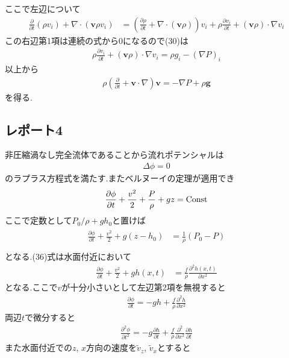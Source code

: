 \documentclass[uplatex,a4j,11pt,dvipdfmx]{jsarticle}
\begin{document}
ここで左辺について
\begin{align}
  \frac{\partial}{\partial t}(\rho v_i)+\nabla\cdot({\bm v}\rho v_i)&=
  \left(\frac{\partial \rho}{\partial t}+\nabla\cdot({\bm v}\rho)\right)v_i+\rho\frac{\partial v_i}{\partial t}+({\bm v}\rho)\cdot\nabla v_i
\end{align}
この右辺第1項は連続の式から0になるので(30)は
\begin{align}
  \rho\frac{\partial v_i}{\partial t}+({\bm v}\rho)\cdot\nabla v_i=\rho g_i-(\nabla P)_i
\end{align}
以上から
\begin{align}
  \rho\left(\frac{\partial}{\partial t}+{\bm v}\cdot\nabla\right){\bm v}=-\nabla P+\rho{\bm g}
\end{align}
を得る.
\subsection*{レポート4}
非圧縮渦なし完全流体であることから流れポテンシャルは
\begin{align}
  \Delta \phi=0
\end{align}
のラプラス方程式を満たす.またベルヌーイの定理が適用でき
\begin{align}
  \frac{\partial\phi}{\partial t}+\frac{v^2}{2}+\frac{P}{\rho}+gz={\rm Const}
\end{align}
ここで定数として$P_0/\rho+gh_0$と置けば
\begin{align}
  \begin{split}
    \frac{\partial\phi}{\partial t}+\frac{v^2}{2}+g(z-h_0)&=\frac{1}{\rho}(P_0-P)\\
  \end{split}
\end{align}
となる.(36)式は水面付近において
\begin{align}
  \frac{\partial\phi}{\partial t}+\frac{v^2}{2}+gh(x,t)&=\frac{f}{\rho}\frac{\partial^2 h(x,t)}{\partial x^2}
\end{align}
となる.ここで$v$が十分小さいとして左辺第2項を無視すると
\begin{align}
  \frac{\partial\phi}{\partial t}=-gh+\frac{f}{\rho}\frac{\partial^2 h}{\partial x^2}
\end{align}
両辺$t$で微分すると
\begin{align}
  \frac{\partial^2\phi}{\partial t^2}=-g\frac{\partial h}{\partial t}+\frac{f}{\rho}\frac{\partial^2}{\partial x^2}\frac{\partial h}{\partial t}
\end{align}
また水面付近での$z$, $x$方向の速度を$\tilde{v}_z$, $\tilde{v}_x$とすると
\end{document}
